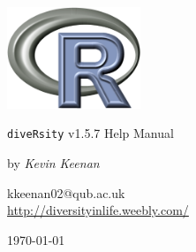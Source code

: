 \begin{titlepage}
\begin{center}
\includegraphics[width=40mm]{Rlogo_3.png}
\end{center}
\begin{center}
\LARGE
\texttt{diveRsity} v1.5.7 Help Manual
\end{center}
\begin{center}
\Large
by \emph{Kevin Keenan}
\end{center}
\begin{center}
\normalsize
kkeenan02@qub.ac.uk\\
\vspace{0.5cm}
\url{http://diversityinlife.weebly.com/}
\end{center}
\begin{center}
\small
\today
\end{center}
\end{titlepage}